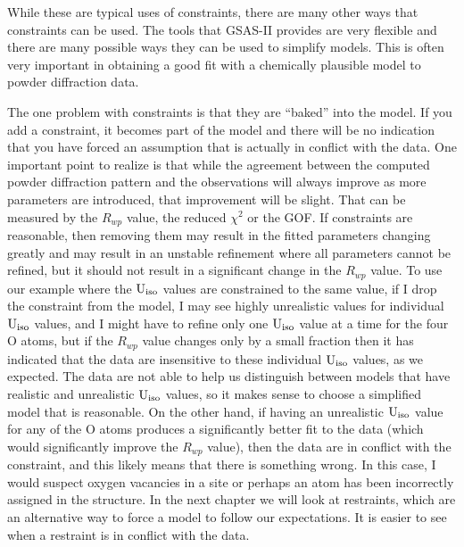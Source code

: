 While these are typical uses of constraints, there are many other ways that constraints can be used. The tools that GSAS-II provides are very flexible and there are many possible ways they can be used to simplify models. This is often very important in obtaining a good fit with a chemically plausible model to powder diffraction data. 

The one problem with constraints is that they are ``baked'' into the model. If you add a constraint, it becomes part of the model and there will be no indication that you have forced an assumption that is actually in conflict with the data. One important point to realize is that while the agreement between the computed powder diffraction pattern and the observations will always improve as more parameters are introduced, that improvement will be slight. That can be measured by the $R_{wp}$ value, the reduced $\chi^2$ or the GOF. If constraints are reasonable, then removing them may result in the fitted parameters changing greatly and may result in an unstable refinement where all parameters cannot be refined, but it should not result in a significant change in the $R_{wp}$ value. To use our example where the $\rm U_{iso}$ values are constrained to the same value, if I drop the constraint from the model, I may see highly unrealistic values for individual  $\rm U_{iso}$ values, and I might have to refine only one  $\rm U_{iso}$ value at a time for the four O atoms, but if the $R_{wp}$ value changes only by a small fraction then it has indicated that the data are insensitive to these individual  $\rm U_{iso}$ values, as we expected. The data are not able to help us distinguish between models that have realistic and unrealistic $\rm U_{iso}$ values, so it makes sense to choose a simplified model that is reasonable. On the other hand, if having an unrealistic $\rm U_{iso}$ value for any of the O atoms produces a significantly better fit to the data (which would significantly improve the $R_{wp}$ value), then the data are in conflict with the constraint, and this likely means that there is something wrong. In this case, I would suspect oxygen vacancies in a site or perhaps an atom has been incorrectly assigned in the structure. In the next chapter we will look at restraints, which are an alternative way to force a model to follow our expectations. It is easier to see when a restraint is in conflict with the data. 